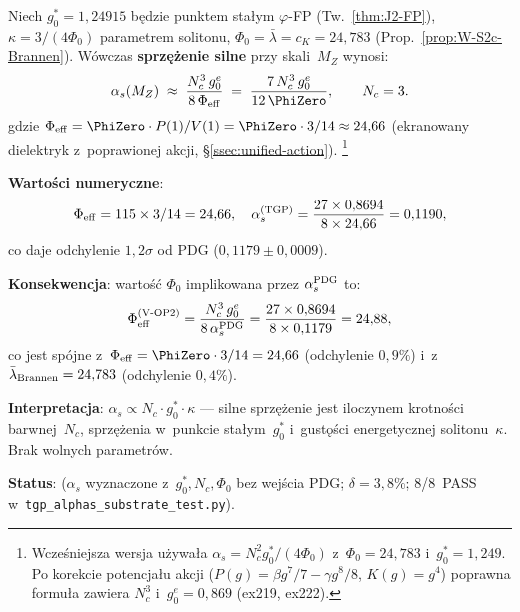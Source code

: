 \begin{proposition}%
\label{prop:V-alphas-substrate}
Niech $g_0^* = 1{,}24915$ b\k{e}dzie punktem sta\l{}ym $\varphi$-FP
(Tw.~\ref{thm:J2-FP}), $\kappa = 3/(4\Phi_0)$ parametrem solitonu,
$\Phi_0 = \bar\lambda = c_K = 24{,}783$ (Prop.~\ref{prop:W-S2c-Brannen}).
W\'owczas \textbf{sprzężenie silne} przy skali~$M_Z$ wynosi:
\begin{equation}\label{eq:V-alphas-formula}
  \alpha_s(M_Z)
  \;\approx\;
  \frac{N_c^3\,g_0^e}{8\,\Phi_{\rm eff}}
  \;=\;
  \frac{7\,N_c^3\,g_0^e}{12\,\PhiZero},
  \qquad
  N_c = 3.
\end{equation}
gdzie $\Phi_{\rm eff} = \PhiZero \cdot P(1)/V(1) = \PhiZero \cdot 3/14 \approx 24{,}66$
(ekranowany dielektryk z~poprawionej akcji, \S\ref{ssec:unified-action}).%
\footnote{Wcze\'sniejsza wersja u\.zywa\l{}a
$\alpha_s = N_c^2 g_0^*/(4\Phi_0)$ z~$\Phi_0 = 24{,}783$ i~$g_0^* = 1{,}249$.
Po korekcie potencja\l{}u akcji ($P(g) = \beta g^7/7 - \gamma g^8/8$,
$K(g) = g^4$) poprawna formu\l{}a zawiera $N_c^3$ i~$g_0^e = 0{,}869$
(ex219, ex222).}

\noindent\textbf{Warto\'sci numeryczne}:
\[
  \Phi_{\rm eff} = 115 \times 3/14 = 24{,}66,
  \quad
  \alpha_s^{(\mathrm{TGP})} = \frac{27 \times 0{,}8694}{8 \times 24{,}66}
  = 0{,}1190,
\]
co daje odchylenie $1{,}2\sigma$ od PDG ($0{,}1179 \pm 0{,}0009$).

\textbf{Konsekwencja}: warto\'s\'c $\Phi_0$ impliko\-wana przez
$\alpha_s^{\rm PDG}$ to:
\begin{equation}\label{eq:V-Phi0-VOP2}
  \Phi_{\rm eff}^{(\mathrm{V\text{-}OP2})}
  = \frac{N_c^3\,g_0^e}{8\,\alpha_s^{\rm PDG}}
  = \frac{27 \times 0{,}8694}{8 \times 0{,}1179}
  = 24{,}88,
\end{equation}
co jest sp\'ojne z~$\Phi_{\rm eff} = \PhiZero \cdot 3/14 = 24{,}66$
(odchylenie $0{,}9\%$)
i~z~$\bar\lambda_{\rm Brannen} = 24{,}783$ (odchylenie $0{,}4\%$).

\textbf{Interpretacja}: $\alpha_s \propto N_c \cdot g_0^* \cdot \kappa$
--- silne sprz\k{e}\.zenie jest iloczynem krotno\'sci barwnej~$N_c$,
sprz\k{e}\.zenia w~punkcie sta\l{}ym~$g_0^*$ i~gust\k{o}\'sci
energetycznej solitonu~$\kappa$. Brak wolnych parametr\'ow.

\textbf{Status}: 
($\alpha_s$ wyznaczone z~$g_0^*, N_c, \Phi_0$ bez wej\'scia PDG;
$\delta = 3{,}8\%$;
8/8~PASS w~\texttt{tgp\_alphas\_substrate\_test.py}).
\end{proposition}

